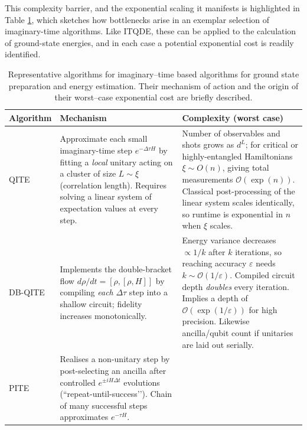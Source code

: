 \documentclass[reprint, aps,prx,showpacs,bibfootnote,preprintnumbers, mathtools, superscriptaddress, amsmath,amssymb]{revtex4-2}
\begin{document}
This complexity barrier, and the exponential scaling it manifests is highlighted in Table \ref{tab:complexity_walls}, which sketches how bottlenecks arise in an exemplar selection of imaginary-time algorithms. Like ITQDE, these can be applied to the calculation of ground-state energies, and in each case a potential exponential cost is readily identified.

\begin{table}[hbt!]
\caption{Representative algorithms for imaginary–time based algorithms for ground state preparation and energy estimation. Their mechanism of action and the origin of their worst–case exponential cost are briefly described.}
\label{tab:complexity_walls}

\begin{ruledtabular}
\renewcommand{\arraystretch}{1.15}  %
\begin{tabular}{p{2.8cm}p{5.1cm}p{5.1cm}}
\textbf{Algorithm} & \textbf{Mechanism} & \textbf{Complexity (worst case)} \\ \hline
%
QITE\,\cite{gomes_adaptive_2021,gomes_efficient_2020,mcardle_variational_2019,motta_determining_2020} &
Approximate each small imaginary-time step $e^{-\Delta\tau H}$ by fitting a \emph{local} unitary acting on a cluster of size $L\!\sim\!\xi$ (correlation length). Requires solving a linear system of expectation values at every step. &
Number of observables and shots grows as $d^{L}$; for critical or highly-entangled Hamiltonians $\xi\!\sim\!O(n)$, giving total measurements $\mathcal{O}(\exp(n))$.  Classical post-processing of the linear system scales identically, so runtime is exponential in $n$ when $\xi$ scales. \\[4pt]
%
DB-QITE\,\cite{gluza_double-bracket_2025} &
Implements the double-bracket flow $d\rho/dt=[\rho,[\rho,H]]$ by compiling \emph{each} $\Delta\tau$ step into a shallow circuit; fidelity increases monotonically. &
Energy variance decreases $\propto 1/k$ after $k$ iterations, so reaching accuracy $\varepsilon$ needs $k\sim\mathcal{O}(1/\varepsilon)$.  Compiled circuit depth \emph{doubles} every iteration. Implies a depth of $\mathcal{O}(\exp(1/\varepsilon))$ for high precision. Likewise ancilla/qubit count if unitaries are laid out serially. \\[4pt]
%
PITE\,\cite{PhysRevResearch.4.033121,kosugi_exhaustive_2023, turro_imaginary-time_2022, nishi_optimal_2023, xie_probabilistic_2022} &
Realises a non-unitary step by post-selecting an ancilla after controlled $e^{\pm iH\Delta t}$ evolutions (“repeat-until-success’’).  Chain of many successful steps approximates $e^{-\tau H}$. &

\end{tabular}
\end{ruledtabular}
\end{table}
\end{document}
